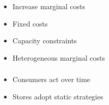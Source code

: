 \documentclass{beamer}
\begin{document}
\begin{frame}
\begin{itemize}
	\item Increase marginal costs
	\item Fixed costs
	\item Capacity constraints
	\item Heterogeneous marginal costs
\end{itemize}
\end{frame}

\begin{frame}
\frametitle{}
\begin{itemize}
	\item Consumers act over time
	\item Stores adopt static strategies
	\end{itemize}
\end{frame}
\end{document}
